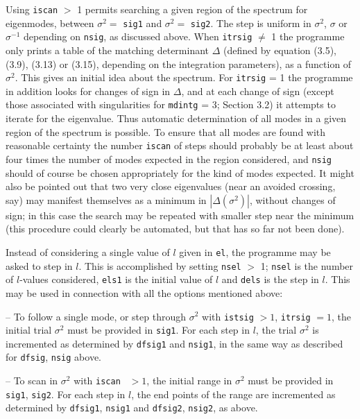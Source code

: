 Using {\tt iscan} $>$ 1 permits searching a given region of the spectrum for
eigenmodes,
between $\sigma^2 =$ {\tt sig1} and $\sigma^2 =$ {\tt sig2}.
The step is uniform in $\sigma^2$, $\sigma$ or
$\sigma^{-1}$ depending on {\tt nsig}, as discussed above.
When {\tt itrsig} $\not=$ 1 the programme only prints
a table of the matching determinant $\Delta$ (defined by
equation (3.5), (3.9), (3.13) or (3.15), depending on the 
integration parameters), as a function of $\sigma^2$.
This gives an initial idea about the spectrum. 
For {\tt itrsig} = 1
the programme in addition looks for changes of sign in $\Delta$,
and at each change of sign (except those associated with singularities
for {\tt mdintg} = 3; {\cf} Section 3.2) 
it attempts to iterate for the eigenvalue.
Thus automatic determination of all modes in a given region of the
spectrum is possible. To ensure that all modes are found with
reasonable certainty the number {\tt iscan} of steps should probably
be at least about four times the number of modes expected in the
region considered, and {\tt nsig} should of course be chosen appropriately
for the kind of modes expected. It might also be pointed out
that two very close eigenvalues (near an avoided crossing, say)
may manifest themselves as a minimum in $| \Delta ( \sigma^2 ) |$,
without changes of sign; in this case the search may be repeated
with smaller step near the minimum (this procedure could clearly be
automated, but that has so far not been done).

Instead of considering a single value of $l$ given in {\tt el},
the programme may be asked to step in $l$.
This is accomplished by setting {\tt nsel} $>$ 1;
{\tt nsel} is the number of $l$-values considered, {\tt els1}
is the initial value of $l$ and {\tt dels} is the step in $l$.
This may be used in connection with all the options mentioned above:
\medskip
\item{--}
To follow a single mode, or step through $\sigma^2$ with
{\tt istsig} $> 1$, {\tt itrsig} $ = 1$, the initial
trial $\sigma^2$ must be provided in {\tt sig1}.
For each step in $l$, the trial $\sigma^2$ is incremented
as determined by {\tt dfsig1} and {\tt nsig1}, in the same
way as described for {\tt dfsig}, {\tt nsig} above.
\item{--}
To scan in $\sigma^2$ with {\tt iscan } $> 1$, 
the initial range in $\sigma^2$ must be provided in {\tt sig1}, {\tt sig2}.
For each step in $l$, the end points of the range are incremented
as determined by {\tt dfsig1}, {\tt nsig1} and {\tt dfsig2}, {\tt nsig2},
as above.

